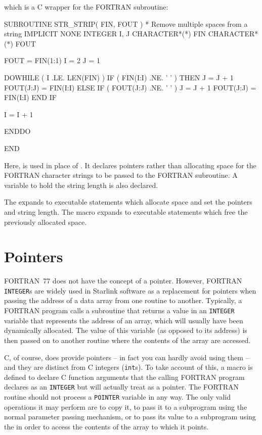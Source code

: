\documentclass[twoside,11pt,nolof]{starlink}
\begin{document}
which is a C wrapper for the FORTRAN subroutine:
\begin{small}
\begin{terminalv}
      SUBROUTINE STR_STRIP( FIN, FOUT )
* Remove multiple spaces from a string
      IMPLICIT NONE
      INTEGER I, J
      CHARACTER*(*) FIN
      CHARACTER*(*) FOUT

      FOUT = FIN(1:1)
      I = 2
      J = 1

      DOWHILE ( I .LE. LEN(FIN) )
         IF ( FIN(I:I) .NE. ' ' ) THEN
            J = J + 1
            FOUT(J:J) = FIN(I:I)
         ELSE IF ( FOUT(J:J) .NE. ' ' )
            J = J + 1
            FOUT(J:J) = FIN(I:I)
         END IF

         I = I + 1

      ENDDO

      END
\end{terminalv}
\end{small}
Here,
is used in place of
\@.
It declares pointers rather than allocating space for the FORTRAN character
strings to be passed to the FORTRAN subroutine. A variable to hold the string
length is also declared.

The
expands to executable statements which allocate space and set the pointers and
string length. The
macro expands to executable statements which free the previously allocated
space.

\section{\label{f77_pointers}Pointers}

FORTRAN~77 does not have the concept of a pointer. However, FORTRAN
\texttt{INTEGER}s are widely used in Starlink software as a
replacement for pointers when passing the address of a data array from
one routine to another. Typically, a FORTRAN program calls a
subroutine that returns a value in an \texttt{INTEGER} variable that
represents the address of an array, which will usually have been
dynamically allocated. The value of this variable (as opposed to its
address) is then passed on to another routine where the contents of
the array are accessed.

C, of course, does provide pointers -- in fact you can hardly avoid
using them -- and they are distinct from C integers (\texttt{int}s). To
take account of this, a macro
is defined to declare C
function arguments that the calling FORTRAN program declares as an
\texttt{INTEGER} but will actually treat as a pointer. The FORTRAN
routine should not process a \texttt{POINTER} variable in any way.
The only valid operations it may perform are to copy it, to pass it to
a subprogram using the normal parameter passing mechanism, or to pass
its value to a subprogram using the
 in order to access the contents
of the array to which it points.
\end{document}
